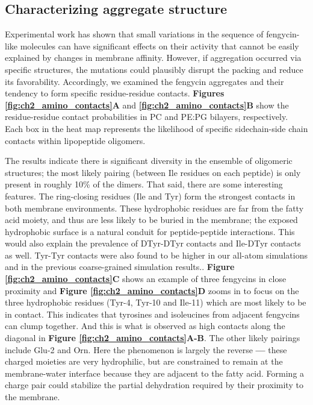 \subsection{Characterizing aggregate structure}
\label{subsec:aminocontacts}
Experimental work has shown that small variations in the sequence of
fengycin-like molecules can have significant effects on their activity that
cannot be easily explained by changes in membrane
affinity.\cite{Heerklotz2015} However, if aggregation occurred via
specific structures, the mutations could plausibly disrupt the packing and
reduce its favorability. Accordingly, we examined the fengycin aggregates and
their tendency to form specific residue-residue contacts.
\textbf{Figures \ref{fig:ch2_amino_contacts}A} and \textbf{\ref{fig:ch2_amino_contacts}B} show the residue-residue
contact probabilities in PC and PE:PG bilayers, respectively.
Each box in the heat map represents the likelihood of specific sidechain-side
chain contacts within lipopeptide oligomers.

The results indicate there is significant diversity in the ensemble of
oligomeric structures; the most likely pairing (between Ile residues on each
peptide) is only present in roughly 10\% of the dimers.  That said, there are
some interesting features.  The ring-closing residues (Ile and Tyr) form the
strongest contacts in both membrane environments. These hydrophobic residues are
far from the fatty acid moiety, and thus are less likely to be buried in the
membrane; the exposed hydrophobic surface is a natural conduit for
peptide-peptide interactions. This would also explain the prevalence of
DTyr-DTyr contacts and Ile-DTyr contacts as well. Tyr-Tyr contacts were also
found to be higher in our all-atom simulations and in the previous
coarse-grained simulation results.\cite{Grossfield2013}.
\textbf{Figure \ref{fig:ch2_amino_contacts}C} shows an example of three fengycins in close
proximity and \textbf{Figure \ref{fig:ch2_amino_contacts}D} zooms in to focus on the
three hydrophobic residues (Tyr-4, Tyr-10 and Ile-11) which are most likely to be in contact.
 This indicates that tyrosines and isoleucines from
adjacent fengycins can clump together.
 And this is what is observed as high contacts along the diagonal in \textbf{Figure \ref{fig:ch2_amino_contacts}A-B}.
The other likely pairings include Glu-2 and Orn. Here the phenomenon is
largely the reverse \textbf{---} these charged moieties are very hydrophilic, but
are constrained to remain at the membrane-water interface because they
are adjacent to the fatty acid. Forming a charge pair could stabilize the partial dehydration required by their proximity to the membrane.

